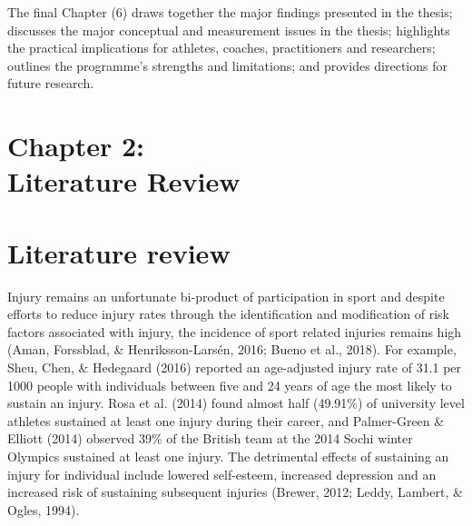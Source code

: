 \documentclass[
  english,
  man,floatsintext]{apa6}
\begin{document}
The final Chapter (6) draws together the major findings presented in the thesis; discusses the major conceptual and measurement issues in the thesis; highlights the practical implications for athletes, coaches, practitioners and researchers; outlines the programme's strengths and limitations; and provides directions for future research.

\clearpage

\vspace*{3cm}

\section[Chapter 2: Literature review]{\Large{Chapter 2: \\ Literature Review}}

\clearpage

\hypertarget{literature-review}{%
\section{Literature review}\label{literature-review}}

Injury remains an unfortunate bi-product of participation in sport and despite efforts to reduce injury rates through the identification and modification of risk factors associated with injury,
the incidence of sport related injuries remains high (Aman, Forssblad, \& Henriksson-Larsén, 2016; Bueno et al., 2018).
For example, Sheu, Chen, \& Hedegaard (2016) reported an age-adjusted injury rate of 31.1 per 1000 people with individuals between five and 24 years of age the most likely to sustain an injury.
Rosa et al. (2014) found almost half (49.91\%) of university level athletes sustained at least one injury during their career, and Palmer-Green \& Elliott (2014) observed 39\% of the British team at the 2014 Sochi winter Olympics sustained at least one injury.
The detrimental effects of sustaining an injury for individual include lowered self-esteem, increased depression and an increased risk of sustaining subsequent injuries (Brewer, 2012; Leddy, Lambert, \& Ogles, 1994).
\end{document}
